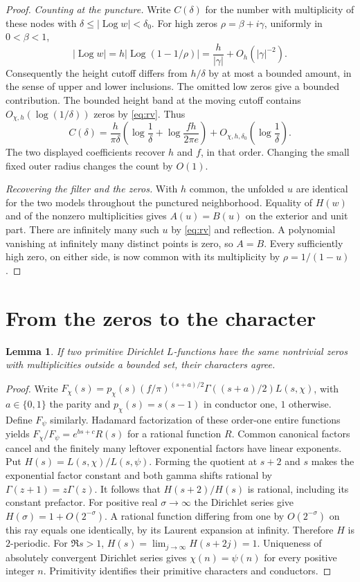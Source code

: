 \documentclass[11pt]{article}
\newtheorem{lemma}[theorem]{Lemma}
\DeclareMathOperator{\Log}{Log}
\begin{document}
\begin{proof}
\emph{Counting at the puncture.}
Write $C(\delta)$ for the number with multiplicity of these nodes with $\delta\le |\Log w|<\delta_0$. For high zeros $\rho=\beta+i\gamma$, uniformly in $0<\beta<1$,
\[
 |\Log w|=h\left|\Log(1-1/\rho)\right|
 =\frac{h}{|\gamma|}+O_h(|\gamma|^{-2}).
\]
Consequently the height cutoff differs from $h/\delta$ by at most a bounded amount, in the sense of upper and lower inclusions. The omitted low zeros give a bounded contribution. The bounded height band at the moving cutoff contains $O_{\chi,h}(\log(1/\delta))$ zeros by \eqref{eq:rv}. Thus
\begin{equation}
 C(\delta)=\frac{h}{\pi\delta}
 \left(\log\frac1\delta+\log\frac{fh}{2\pi e}\right)
 +O_{\chi,h,\delta_0}\!\left(\log\frac1\delta\right). \label{eq:count}
\end{equation}
The two displayed coefficients recover $h$ and $f$, in that order. Changing the small fixed outer radius changes the count by $O(1)$.

\emph{Recovering the filter and the zeros.}
With $h$ common, the unfolded $u$ are identical for the two models throughout the punctured neighborhood. Equality of $H(w)$ and of the nonzero multiplicities gives $A(u)=B(u)$ on the exterior and unit part. There are infinitely many such $u$ by \eqref{eq:rv} and reflection. A polynomial vanishing at infinitely many distinct points is zero, so $A=B$. Every sufficiently high zero, on either side, is now common with its multiplicity by $\rho=1/(1-u)$.
\end{proof}

\section{From the zeros to the character}\label{sec:finish}
\begin{lemma}\label{lem:char}
If two primitive Dirichlet $L$-functions have the same nontrivial zeros with multiplicities outside a bounded set, their characters agree.
\end{lemma}
\begin{proof}
Write $F_\chi(s)=p_\chi(s)(f/\pi)^{(s+a)/2}\Gamma((s+a)/2)L(s,\chi)$, with $a\in\{0,1\}$ the parity and $p_\chi(s)=s(s-1)$ in conductor one, $1$ otherwise. Define $F_\psi$ similarly. Hadamard factorization of these order-one entire functions yields $F_\chi/F_\psi=e^{bs+c}R(s)$ for a rational function $R$. Common canonical factors cancel and the finitely many leftover exponential factors have linear exponents. Put $H(s)=L(s,\chi)/L(s,\psi)$. Forming the quotient at $s+2$ and $s$ makes the exponential factor constant and both gamma shifts rational by $\Gamma(z+1)=z\Gamma(z)$. It follows that $H(s+2)/H(s)$ is rational, including its constant prefactor. For positive real $\sigma\to\infty$ the Dirichlet series give $H(\sigma)=1+O(2^{-\sigma})$. A rational function differing from one by $O(2^{-\sigma})$ on this ray equals one identically, by its Laurent expansion at infinity. Therefore $H$ is $2$-periodic. For $\Re s>1$, $H(s)=\lim_{j\to\infty}H(s+2j)=1$. Uniqueness of absolutely convergent Dirichlet series gives $\chi(n)=\psi(n)$ for every positive integer $n$. Primitivity identifies their primitive characters and conductors.
\end{proof}
\end{document}
